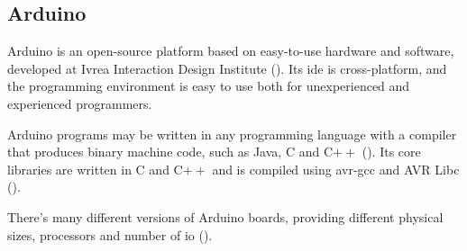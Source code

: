 \subsection{Arduino}
Arduino is an open-source platform based on easy-to-use hardware and software, developed at Ivrea Interaction Design Institute  (\cite{arduino2}). Its \acrfull{ide} is cross-platform, and the programming environment is easy to use both for unexperienced and experienced programmers.

Arduino programs may be written in any programming language with a compiler that produces binary machine code, such as Java, C and C$++$ (\cite{arduino}). Its core libraries are written in C and C$++$ and is compiled using avr-gcc and AVR Libc (\cite{arduinobuild}).

There's many different versions of Arduino boards, providing different physical sizes, processors and number of \acrfull{io} (\cite{arduinoboards}). 